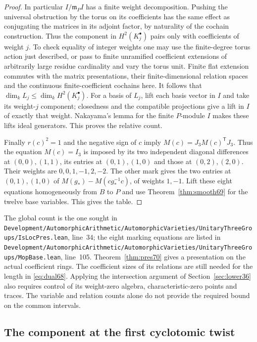 \documentclass[a4paper,11pt]{article}
\theoremstyle{definition}
\theoremstyle{remark}
\newcommand{\srcloc}[2]{{\small\nolinkurl{#1.lean}}, line~#2}
\numberwithin{equation}{section}
\begin{document}
\begin{proof}
In particular \(I/\mathfrak m_P I\) has a finite weight
decomposition. Pushing the universal obstruction by the torus
on its coefficients has the same effect as conjugating the
matrices in its adjoint factor, by naturality of the cochain
construction. Thus the component in \(H^2(K_j^\bullet)\)
pairs only with coefficients of weight \(j\). To check equality
of integer weights one may use the finite-degree torus action
just described, or pass to finite unramified coefficient
extensions of arbitrarily large residue cardinality and vary
the torus unit. Finite flat extension commutes with the matrix
presentations, their finite-dimensional relation spaces and the
continuous finite-coefficient cochains here. It follows that
\(\dim_k L_j\le\dim_k H^2(K_j^\bullet)\).
For a basis of \(L_j\), lift each basis vector in \(I\) and
take its weight-\(j\) component; closedness and the compatible
projections give a lift in \(I\) of exactly that weight.
Nakayama's lemma for the finite \(P\)-module \(I\) makes these
lifts ideal generators. This proves the relative count.

Finally \(r(c)^2=1\) and the negative sign of \(c\) imply
\(M(c)=J_3M(c)^{\mathsf T}J_3\). Thus the equation
\(M(c)=I_3\) is imposed by its two independent diagonal
differences at \((0,0),(1,1)\), its entries at \((0,1),(1,0)\)
and those at \((0,2),(2,0)\). Their weights are
\(0,0,1,-1,2,-2\). The other mark gives the two entries at
\((0,1),(1,0)\) of \(M(g_*)-M(cg_*^{-1}c)\), of weights
\(1,-1\). Lift these eight equations homogeneously from \(B\)
to \(P\) and use Theorem~\ref{thm:smooth69} for the twelve
base variables. This gives the table.
\end{proof}

The global count is the one sought in
\srcloc{Development/AutomorphicArithmetic/AutomorphicVarieties/UnitaryThreeGroups/IsLocPres}{34};
the eight marking equations are listed in
\srcloc{Development/AutomorphicArithmetic/AutomorphicVarieties/UnitaryThreeGroups/MopBase}{105}.
Theorem~\ref{thm:pres70} gives a presentation on the actual
coefficient rings. The coefficient sizes of its relations are
still needed for the length in \eqref{eq:dual68}. Applying the
intersection argument of Section~\ref{sec:lower36} also requires
control of its weight-zero algebra, characteristic-zero points
and traces. The variable and relation counts alone do not
provide the required bound on the common intervals.

\subsection{The component at the first cyclotomic twist}\label{nav:IV-16}
\label{sec:kummer72}
\end{document}
